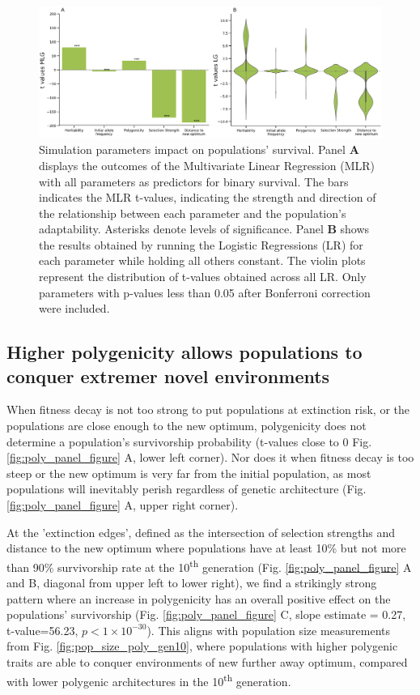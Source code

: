 \documentclass{article}
\begin{document}
\begin{figure}[h]
    \centering
    \includegraphics[width=1\textwidth]{figures/glm_logisticreg_newver.pdf}
    \caption{Simulation parameters impact on populations' survival.  Panel \textbf{A} displays the outcomes of the Multivariate Linear Regression (MLR) with all parameters as predictors for binary survival. The bars indicates the MLR t-values, indicating the strength and direction of the relationship between each parameter and the population's adaptability. Asterisks denote levels of significance. Panel \textbf{B} shows the results obtained by running the
    Logistic Regressions (LR) for each parameter while holding all others constant. The violin plots represent the distribution of t-values obtained across all LR. Only parameters with p-values less than 0.05 after Bonferroni correction were included.}
    \label{fig:glm_logisticreg}
\end{figure}


\subsection{Higher polygenicity allows populations to conquer extremer novel environments}
When fitness decay is not too strong to put populations at extinction risk, or the populations are close enough to the new optimum, polygenicity does not determine a population's survivorship probability (t-values close to 0 Fig. \ref{fig:poly_panel_figure} A, lower left corner). Nor does it when fitness decay is too steep or the new optimum is very far from the initial population, as most populations will inevitably perish regardless of genetic architecture (Fig. \ref{fig:poly_panel_figure} A, upper right corner).

At the 'extinction edges', defined as the intersection of selection strengths and distance to the new optimum where populations have at least 10\% but not more than 90\% survivorship rate at the 10\textsuperscript{th} generation (Fig. \ref{fig:poly_panel_figure} A and B, diagonal from upper left to lower right), we find a strikingly strong pattern where an increase in polygenicity has an overall positive effect on the populations' survivorship (Fig. \ref{fig:poly_panel_figure}  C, slope estimate = 0.27, t-value=56.23,  $p<1 \times 10^{-30}$). This aligns with population size measurements from Fig. \ref{fig:pop_size_poly_gen10}, where populations with higher polygenic traits are able to conquer environments of new further away optimum, compared with lower polygenic architectures in the 10\textsuperscript{th} generation.
\end{document}
